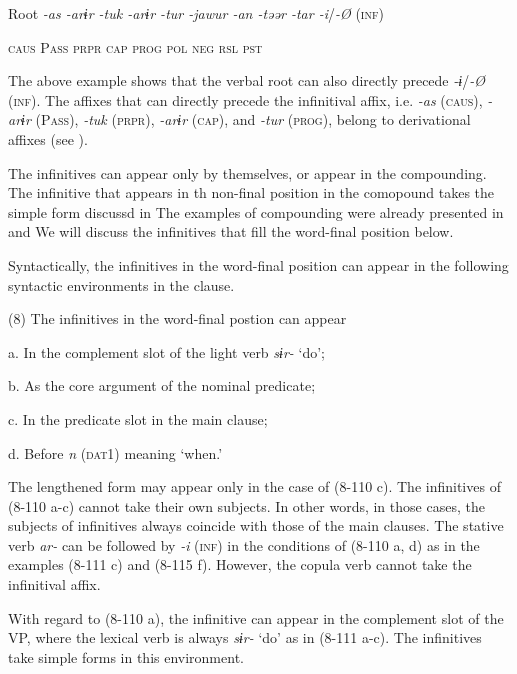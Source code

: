   Root  \textit{{}-as  {}-arɨr  {}-tuk  {}-arɨr  {}-tur  {}-jawur  {}-an  {}-təər  {}-tar  {}-i}/\textit{{}-Ø} (\textsc{inf})

    \textsc{caus}  P\textsc{ass}  \textsc{prpr}  \textsc{cap}  \textsc{prog}  \textsc{pol}  \textsc{neg}  \textsc{rsl}  \textsc{pst}

The above example shows that the verbal root can also directly precede \textit{{}-ɨ}/\textit{{}-Ø} (\textsc{inf}). The affixes that can directly precede the infinitival affix, i.e. \textit{{}-as} (\textsc{caus}), \textit{{}-arɨr} (P\textsc{ass}), \textit{{}-tuk} (\textsc{prpr}), \textit{{}-arɨr} (\textsc{cap}), and \textit{{}-tur} (\textsc{prog}), belong to derivational affixes (see ).

  The infinitives can appear only by themselves, or appear in the compounding. The infinitive that appears in th non-final position in the comopound takes the simple form discussd in  The examples of compounding were already presented in  and  We will discuss the infinitives that fill the word-final position below.

  Syntactically, the infinitives in the word-final position can appear in the following syntactic environments in the clause.

(8)  The infinitives in the word-final postion can appear

  a. In the complement slot of the light verb \textit{sɨr-} ‘do’;

  b. As the core argument of the nominal predicate;

  c. In the predicate slot in the main clause;

  d. Before \textit{n} (\textsc{dat}1) meaning ‘when.’

The lengthened form may appear only in the case of (8-110 c). The infinitives of (8-110 a-c) cannot take their own subjects. In other words, in those cases, the subjects of infinitives always coincide with those of the main clauses. The stative verb \textit{ar-} can be followed by \textit{{}-i} (\textsc{inf}) in the conditions of (8-110 a, d) as in the examples (8-111 c) and (8-115 f). However, the copula verb cannot take the infinitival affix.

With regard to (8-110 a), the infinitive can appear in the complement slot of the VP, where the lexical verb is always \textit{sɨr-} ‘do’ as in (8-111 a-c). The infinitives take simple forms in this environment.

